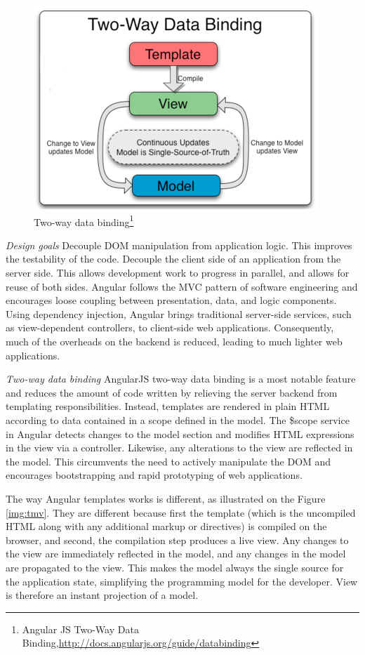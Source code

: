     \begin{figure}[!ht]
	\centering
	\includegraphics[scale=0.8]{images/2wayBinding.png}   
	\caption[Two-way data binding]{Two-way data binding\footnote{Angular JS Two-Way Data Binding,\url{http://docs.angularjs.org/guide/databinding}}}
	\label{img:data-binding}
	\end{figure}

\emph{Design goals}
\newline
Decouple DOM manipulation from application logic. This improves the testability of the code. Decouple the client side of an application from the server side. This allows development work to progress in parallel, and allows for reuse of both sides.	Angular follows the MVC pattern of software engineering and encourages loose coupling between presentation, data, and logic components. Using dependency injection, Angular brings traditional server-side services, such as view-dependent controllers, to client-side web applications. Consequently, much of the overheads on the backend is reduced, leading to much lighter web applications.

\emph{Two-way data binding}
\newline
AngularJS two-way data binding is a most notable feature and reduces the amount of code written by relieving the server backend from templating responsibilities. Instead, templates are rendered in plain HTML according to data contained in a scope defined in the model. The \$scope service in Angular detects changes to the model section and modifies HTML expressions in the view via a controller. Likewise, any alterations to the view are reflected in the model. This circumvents the need to actively manipulate the DOM and encourages bootstrapping and rapid prototyping of web applications.

The way Angular templates works is different, as illustrated on the Figure \ref{img:tmv}. They are different because first the template (which is the uncompiled HTML along with any additional markup or directives) is compiled on the browser, and second, the compilation step produces a live view. Any changes to the view are immediately reflected in the model, and any changes in the model are propagated to the view. This makes the model always the single source for the application state, simplifying the programming model for the developer. View is therefore an instant projection of a model.

